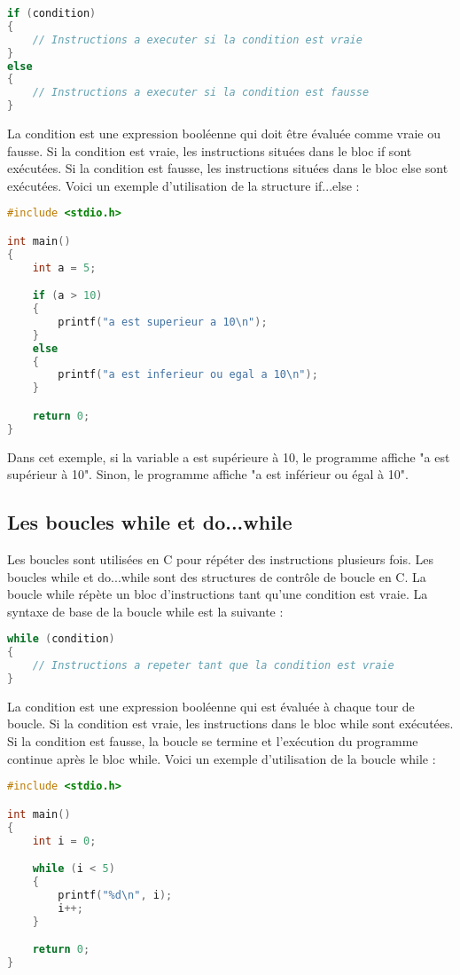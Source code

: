 \documentclass{uofa-eng-assignment}
\begin{document}
\begin{lstlisting}[language=C]
if (condition)
{
    // Instructions a executer si la condition est vraie
}
else
{
    // Instructions a executer si la condition est fausse
}
\end{lstlisting}
\noindent \newline
La condition est une expression booléenne qui doit être évaluée comme vraie ou fausse. Si la condition est vraie, les instructions situées dans le bloc if sont exécutées. Si la condition est fausse, les instructions situées dans le bloc else sont exécutées.
\newline \newline
Voici un exemple d'utilisation de la structure if...else :

\begin{lstlisting}[language=C]
#include <stdio.h>

int main()
{
    int a = 5;

    if (a > 10)
    {
        printf("a est superieur a 10\n");
    }
    else
    {
        printf("a est inferieur ou egal a 10\n");
    }

    return 0;
}
\end{lstlisting}

\noindent \newline
Dans cet exemple, si la variable a est supérieure à 10, le programme affiche "a est supérieur à 10". Sinon, le programme affiche "a est inférieur ou égal à 10".

\subsection{Les boucles while et do...while}
Les boucles sont utilisées en C pour répéter des instructions plusieurs fois. Les boucles while et do...while sont des structures de contrôle de boucle en C.
\newline \newline
La boucle while répète un bloc d'instructions tant qu'une condition est vraie. La syntaxe de base de la boucle while est la suivante :

\begin{lstlisting}[language=c]
while (condition)
{
    // Instructions a repeter tant que la condition est vraie
}
\end{lstlisting}

\noindent \newline
La condition est une expression booléenne qui est évaluée à chaque tour de boucle. Si la condition est vraie, les instructions dans le bloc while sont exécutées. Si la condition est fausse, la boucle se termine et l'exécution du programme continue après le bloc while.
\newline \newline
Voici un exemple d'utilisation de la boucle while :
\begin{lstlisting}[language=c]
#include <stdio.h>

int main()
{
    int i = 0;

    while (i < 5)
    {
        printf("%d\n", i);
        i++;
    }

    return 0;
}
\end{lstlisting}
\end{document}
